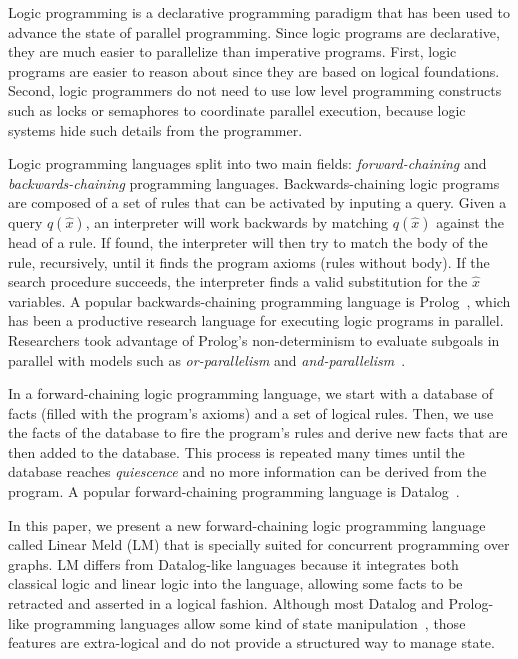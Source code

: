 Logic programming is a declarative programming paradigm that has been used to advance the state of parallel programming.
Since logic programs are declarative, they are much easier to parallelize than imperative programs.
First, logic programs are easier to reason about since they are based on logical foundations.
Second, logic programmers do not need to use low level programming constructs such as locks or semaphores to
coordinate parallel execution, because logic systems hide such details from the programmer.

Logic programming languages split into two main fields: \emph{forward-chaining} and \emph{backwards-chaining} 
programming languages. Backwards-chaining logic programs are composed of a set of rules that can be activated by inputing a query. Given a query $q(\hat{x})$, an interpreter will work backwards by matching $q(\hat{x})$ against the head of a rule. If found, the interpreter will then try to match the body of the rule, recursively, until it finds the program axioms (rules without body). If the search procedure succeeds, the interpreter finds a valid substitution for the $\hat{x}$ variables. A popular backwards-chaining programming
language is Prolog~\cite{Colmerauer:1993:BP:154766.155362}, which has been a productive research language for executing logic
programs in parallel. Researchers took advantage of Prolog's non-determinism to evaluate subgoals
in parallel with models such as \emph{or-parallelism} and \emph{and-parallelism}~\cite{Gupta:2001:PEP:504083.504085}.

In a forward-chaining logic programming language, we start with a database of facts (filled with the program's
axioms) and a set of logical rules. Then, we use the facts of the database to fire the program's rules and derive new facts that are
then added to the database. This process is repeated many times until the database reaches \emph{quiescence} and no more information can
be derived from the program.
A popular forward-chaining programming language is Datalog~\cite{Ramakrishnan93asurvey}.

In this paper, we present a new forward-chaining logic programming language called Linear Meld (LM) that is specially suited
for concurrent programming over graphs. LM differs from Datalog-like languages because it integrates both classical
logic and linear logic into the language, allowing some facts to be retracted and asserted in a logical fashion. Although most
Datalog and Prolog-like programming languages allow some kind of state manipulation~\cite{Liu98extendingdatalog}, those features
are extra-logical and do not provide a structured way to manage state.

